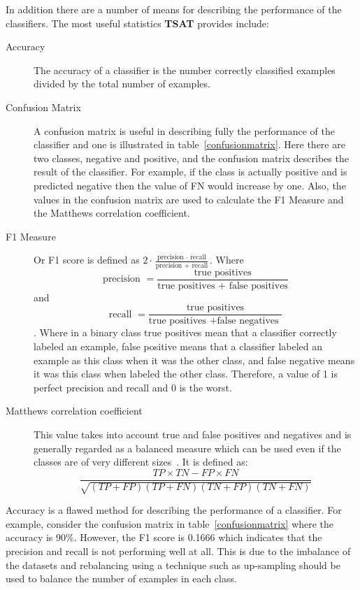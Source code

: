\documentclass[titlepage, letterpaper, 12pt]{article}
\newcommand\TSAT{\textbf{TSAT}}
\begin{document}
In addition there are a number of means for describing the performance of the classifiers.  The most useful statistics {\TSAT} provides include:
\begin{description}
	\item[Accuracy] The accuracy of a classifier is the number correctly classified examples divided by the total number of examples. 
	\item[Confusion Matrix] A confusion matrix is useful in describing fully the performance of the classifier and one is illustrated in table~\ref{confusionmatrix}.  Here there are two classes, negative and positive, and the confusion matrix describes the result of the classifier.  For example, if the class is actually positive and is predicted negative then the value of FN would increase by one.  Also, the values in the confusion matrix are used to calculate the F1 Measure and the Matthews correlation coefficient.
	\item[F1 Measure] Or F1 score is defined as \(2\cdot \frac{\textrm{precision }\cdot \textrm{ recall}}{\textrm{precision }+\textrm{ recall}}\).  Where \[\textrm{precision } = \frac{\textrm{true positives}}{\textrm{true positives } + \textrm{ false positives}}\] and \[\textrm{recall } = \frac{\textrm{true positives}}{\textrm{true positives } + \textrm{false negatives }}\].  Where in a binary class true positives mean that a classifier correctly labeled an example, false positive means that a classifier labeled an example as this class when it was the other class, and false negative means it was this class when labeled the other class.  Therefore, a value of 1 is perfect precision and recall and 0 is the worst.
	\item[Matthews correlation coefficient] This value takes into account true and false positives and negatives and is generally regarded as a balanced measure which can be used even if the classes are of very different sizes~\cite{MCC}.  It is defined as: \[\frac{TP\times TN - FP \times FN}{\sqrt{(TP + FP)(TP + FN)(TN+FP)(TN+FN)}} \]
\end{description}

Accuracy is a flawed method for describing the performance of a classifier.  For example, consider the confusion matrix in table~\ref{confusionmatrix} where the accuracy is 90\%.  However, the F1 score is 0.1666 which indicates that the precision and recall is not performing well at all.  This is due to the imbalance of the datasets and rebalancing using a technique such as up-sampling should be used to balance the number of examples in each class.
\end{document}
